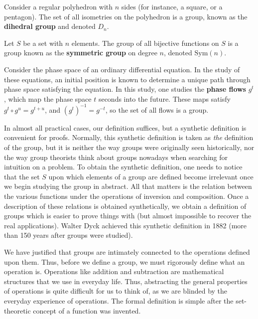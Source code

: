 \begin{example}
    Consider a regular polyhedron with $n$ sides (for instance, a square, or a pentagon). The set of all isometries on the polyhedron is a group, known as the {\bf dihedral group} and denoted $D_n$.
\end{example}

\begin{example}
    Let $S$ be a set with $n$ elements. The group of all bijective functions on $S$ is a group known as the {\bf symmetric group} on degree $n$, denoted $\mathrm{Sym}(n)$.
\end{example}

\begin{example}
    Consider the phase space of an ordinary differential equation. In the study of these equations, an initial position is known to determine a unique path through phase space satisfying the equation. In this study, one studies the {\bf phase flows} $g^t$, which map the phase space $t$ seconds into the future. These maps satisfy $g^t \circ g^u = g^{t + u}$, and $(g^t)^{-1} = g^{-t}$, so the set of all flows is a group.
\end{example}

In almost all practical cases, our definition suffices, but a synthetic definition is convenient for proofs. Normally, this synthetic definition is taken as {\it the} definition of the group, but it is neither the way groups were originally seen historically, nor the way group theorists think about groups nowadays when searching for intuition on a problem. To obtain the synthetic definition, one needs to notice that the set $S$ upon which elements of a group are defined become irrelevant once we begin studying the group in abstract. All that matters is the relation between the various functions under the operations of inversion and composition. Once a description of these relations is obtained synthetically, we obtain a definition of groups which is easier to prove things with (but almost impossible to recover the real applications). Walter Dyck achieved this synthetic definition in 1882 (more than 150 years after groups were studied).

We have justified that groups are intimately connected to the operations defined upon them. Thus, before we define a group, we must rigorously define what an operation is. Operations like addition and subtraction are mathematical structures that we use in everyday life. Thus, abstracting the general properties of operations is quite difficult for us to think of, as we are blinded by the everyday experience of operations. The formal definition is simple after the set-theoretic concept of a function was invented.

